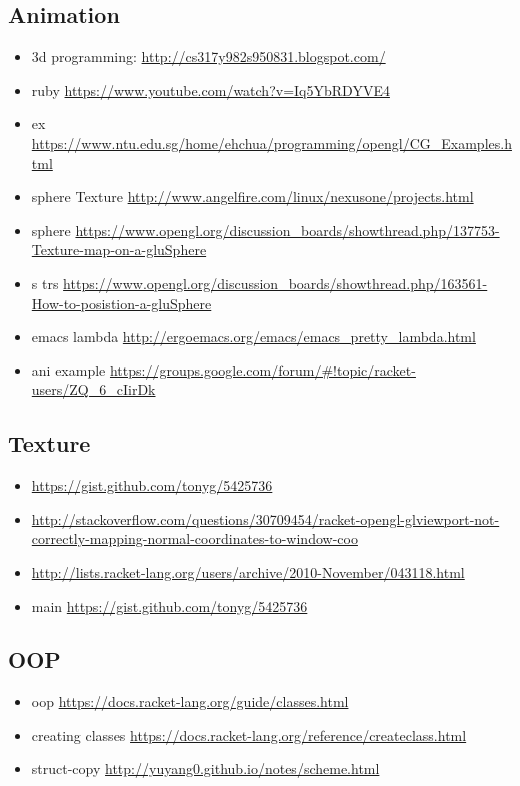 \documentclass[9pt,b5paper]{article}
\begin{document}
\subsection{Animation}
\label{sec-2-3}
\begin{itemize}
\item 3d programming: \url{http://cs317y982s950831.blogspot.com/}
\item ruby \url{https://www.youtube.com/watch?v=Iq5YbRDYVE4}
\item ex \url{https://www.ntu.edu.sg/home/ehchua/programming/opengl/CG_Examples.html}
\item sphere Texture \url{http://www.angelfire.com/linux/nexusone/projects.html}
\item sphere \url{https://www.opengl.org/discussion_boards/showthread.php/137753-Texture-map-on-a-gluSphere}
\item s trs \url{https://www.opengl.org/discussion_boards/showthread.php/163561-How-to-posistion-a-gluSphere}
\item emacs lambda \url{http://ergoemacs.org/emacs/emacs_pretty_lambda.html}
\item ani example \url{https://groups.google.com/forum/#!topic/racket-users/ZQ_6_cIirDk}
\end{itemize}
\subsection{Texture}
\label{sec-2-4}
\begin{itemize}
\item \url{https://gist.github.com/tonyg/5425736}
\item \url{http://stackoverflow.com/questions/30709454/racket-opengl-glviewport-not-correctly-mapping-normal-coordinates-to-window-coo}
\item \url{http://lists.racket-lang.org/users/archive/2010-November/043118.html}
\item main \url{https://gist.github.com/tonyg/5425736}
\end{itemize}

\subsection{OOP}
\label{sec-2-5}
\begin{itemize}
\item oop \url{https://docs.racket-lang.org/guide/classes.html}
\item creating classes \url{https://docs.racket-lang.org/reference/createclass.html}
\item struct-copy \url{http://yuyang0.github.io/notes/scheme.html}
\end{itemize}
\end{document}
